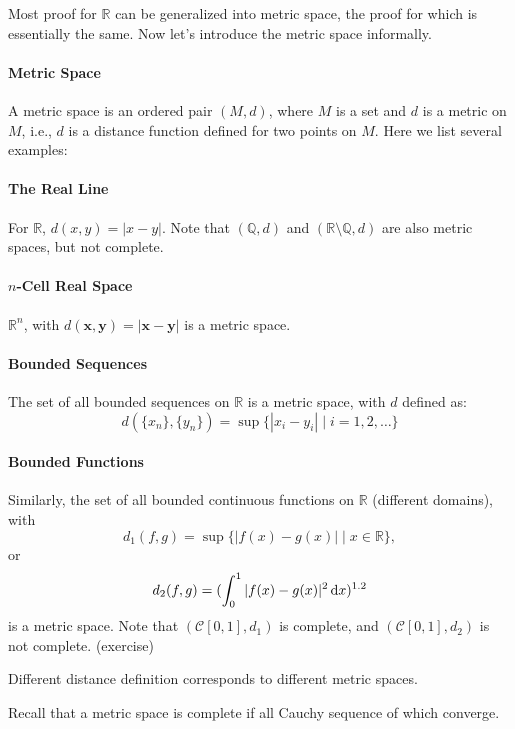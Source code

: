 Most proof for $\mathbb{R}$ can be generalized into metric space, the proof for which is essentially the same. Now let's introduce the metric space informally.

\paragraph{Metric Space}
A metric space is an ordered pair $(M,d)$, where $M$ is a set and $d$ is a metric on $M$, i.e., $d$ is a distance function defined for two points on $M$. Here we list several examples:
\paragraph{The Real Line}
For $\mathbb{R}$, $d(x,y) = |x-y|$. 
Note that $(\mathbb{Q},d)$ and $(\mathbb{R}\setminus\mathbb{Q},d)$ are also metric spaces, but not complete.

\paragraph{$n$-Cell Real Space}
$\mathbb{R}^n$, with $d(\bm x,\bm y) = |\bm x - \bm y|$ is a metric space.

\paragraph{Bounded Sequences}
The set of all bounded sequences on $\mathbb{R}$ is a metric space, with $d$ defined as:
\[
d(\{x_n\},\{y_n\}) = \sup\{|x_i - y_i|\mid i=1,2,\dots\}
\]
\paragraph{Bounded Functions}
Similarly, the set of all bounded continuous functions on $\mathbb{R}$ (different domains), with 
\[
d_1(f,g) = \sup\{|f(x) - g(x)|\mid x\in\mathbb{R}\},
\] 
or 
\[
d_2(f,g) =( \int_0^1|f(x) - g(x)|^2\,\mathrm{d} x)^{1.2}
\]
is a metric space. Note that $(\mathcal{C}[0,1],d_1)$ is complete, and $(\mathcal{C}[0,1],d_2)$ is not complete. (exercise)
\begin{remark}

Different distance definition corresponds to different metric spaces.

Recall that a metric space is complete if all Cauchy sequence of which converge.
\end{remark}


